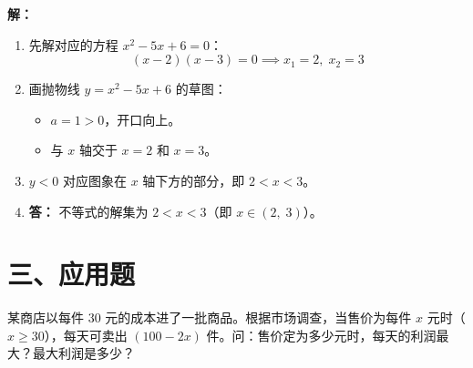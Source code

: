 \documentclass[12pt, a4paper]{ctexart}
\begin{document}
\textbf{解：}
\begin{enumerate}[leftmargin=2em]
  \item 先解对应的方程 $x^2 - 5x + 6 = 0$：
  \[
  (x - 2)(x - 3) = 0 \implies x_1 = 2,\; x_2 = 3
  \]
  \item 画抛物线 $y = x^2 - 5x + 6$ 的草图：
  \begin{itemize}
    \item $a = 1 > 0$，开口向上。
    \item 与 $x$ 轴交于 $x = 2$ 和 $x = 3$。
  \end{itemize}
  \begin{center}
  \end{center}
  \item $y < 0$ 对应图象在 $x$ 轴下方的部分，即 $2 < x < 3$。
  \item \textbf{答：} 不等式的解集为 $2 < x < 3$（即 $x \in (2,\; 3)$）。
\end{enumerate}


\section*{\textcolor{apppurple}{三、应用题}}

\begin{appbox}[【应用 1】利润最大化问题]
某商店以每件 $30$ 元的成本进了一批商品。根据市场调查，当售价为每件 $x$ 元时（$x \geq 30$），每天可卖出 $(100 - 2x)$ 件。问：售价定为多少元时，每天的利润最大？最大利润是多少？
\end{appbox}
\end{document}
